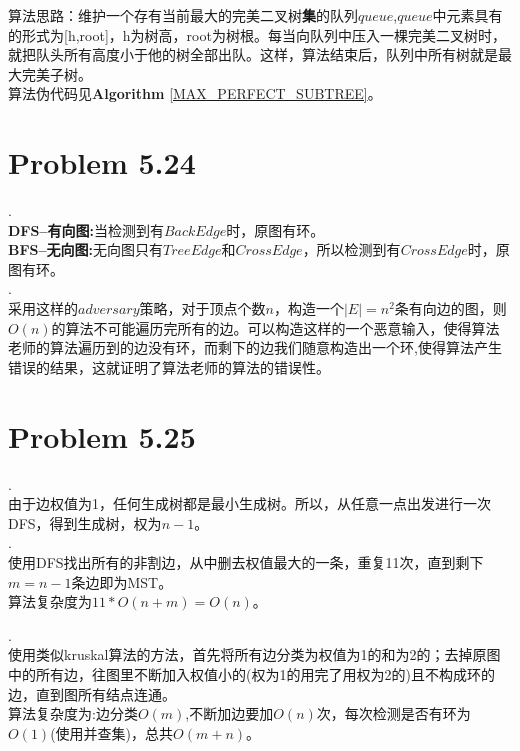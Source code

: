 \documentclass[twocolumn]{ctexart}
\begin{document}
\indent 算法思路：维护一个存有当前最大的完美二叉树\textbf{集}的队列$queue$,$queue$中元素具有的形式为[h,root]，h为树高，root为树根。每当向队列中压入一棵完美二叉树时，就把队头所有高度小于他的树全部出队。这样，算法结束后，队列中所有树就是最大完美子树。\\
\indent
算法伪代码见\textbf{Algorithm} \ref{MAX_PERFECT_SUBTREE}。\\


\section*{Problem 5.24}
.\\
\indent \textbf{DFS--有向图:}当检测到有$Back Edge$时，原图有环。\\
\indent \textbf{BFS--无向图:}无向图只有$Tree Edge$和$Cross Edge$，所以检测到有$Cross Edge$时，原图有环。\\


.\\
\indent 采用这样的$adversary$策略，对于顶点个数$n$，构造一个$|E|=n^2$条有向边的图，则$O(n)$的算法不可能遍历完所有的边。可以构造这样的一个恶意输入，使得算法老师的算法遍历到的边没有环，而剩下的边我们随意构造出一个环,使得算法产生错误的结果，这就证明了算法老师的算法的错误性。\\

\section*{Problem 5.25}
.\\
\indent 由于边权值为1，任何生成树都是最小生成树。所以，从任意一点出发进行一次DFS，得到生成树，权为$n-1$。\\

.\\
\indent 使用DFS找出所有的非割边，从中删去权值最大的一条，重复11次，直到剩下$m=n-1$条边即为MST。\\
\indent 算法复杂度为$11*O(n+m)=O(n)$。


.\\
\indent
使用类似kruskal算法的方法，首先将所有边分类为权值为1的和为2的；去掉原图中的所有边，往图里不断加入权值小的(权为1的用完了用权为2的)且不构成环的边，直到图所有结点连通。\\
\indent 算法复杂度为:边分类$O(m)$,不断加边要加$O(n)$次，每次检测是否有环为$O(1)$(使用并查集)，总共$O(m+n)$。
\end{document}
